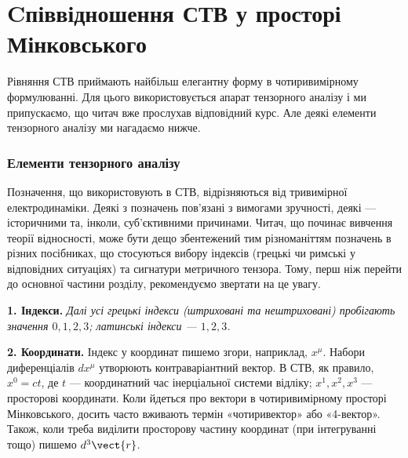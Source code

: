 

\chapter{Cпіввідношення СТВ у просторі Мінковського}\label{\currfilebase}

Рівняння СТВ приймають найбільш елегантну форму в чотиривимірному
формулюванні. Для цього використовується апарат тензорного аналізу і ми
припускаємо, що читач вже прослухав відповідний курс. Але деякі елементи
тензорного аналізу ми нагадаємо нижче.

\subsection*{Елементи тензорного аналізу}

Позначення, що використовують в СТВ, відрізняються від тривимірної
електродинаміки. Деякі з позначень пов'язані з вимогами зручності, деякі
--- історичними та, інколи, суб'єктивними причинами.
Читач, що починає вивчення теорії відносності, може бути дещо
збентежений тим різноманіттям позначень в різних посібниках, що
стосуються вибору індексів (грецькі чи римські у відповідних ситуаціях)
та сигнатури метричного тензора. Тому, перш ніж перейти до основної
частини розділу, рекомендуємо звертати на це увагу.

\textbf{1. Індекси.}
\textit{Далі усі грецькі індекси (штриховані та нештриховані) пробігають
значення $0,1,2,3$; латинські індекси --- $1,2,3$.}

\textbf{2. Координати.} Індекс у координат пишемо згори, наприклад,
$x^\mu$. Набори диференціалів $dx^\mu$ утворюють контраваріантний вектор. В
СТВ, як правило, $x^0 = ct$, де $t$ --- координатний час інерціальної
системи відліку; $x^1, x^2, x^3$ --- просторові координати. Коли
йдеться про вектори в чотиривимірному просторі Мінковського, досить
часто вживають термін «чотиривектор» або «4-вектор». Також, коли треба
виділити просторову частину координат (при інтегруванні тощо) пишемо
$d^3\vect{r}$.


